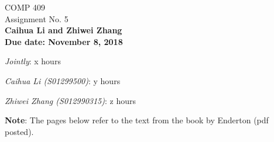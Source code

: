 \documentclass[12pt]{article}
\begin{document}
	\pagestyle{empty}
	
	\begin{center}
		{\Large COMP 409\\
			Assignment No. 5}\\
		\bf{Caihua Li and Zhiwei Zhang}\\
		{\bf Due date: November 8, 2018}
	\end{center}
	
	\noindent\emph{Jointly}: x hours
	
	\noindent \emph{Caihua Li (S01299500)}: y hours
	
	\noindent\emph{Zhiwei Zhang (S012990315)}:  z hours
	
	\bigskip
	
	\bigskip
	
	\noindent
	
	
	
	\bigskip
	
	\noindent
	{\bf Note}: The pages below refer to the text from the book by
	Enderton (pdf posted).
	
\end{document}
